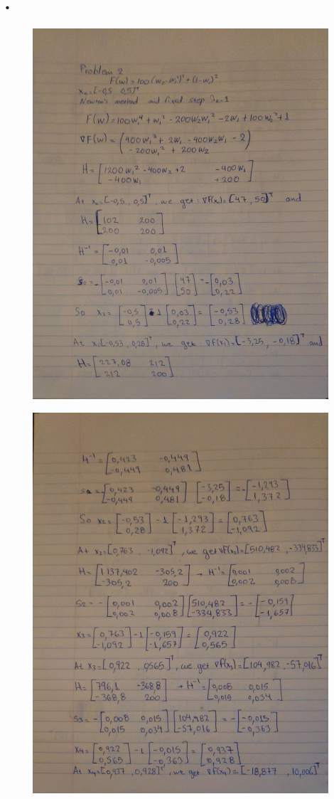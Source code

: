 \documentclass{article}
\begin{document}
\newpage
\section{.}
\begin{figure}[htp]
    \centering
    \includegraphics[width=11cm]{photos/2_1.jpg}
    \caption{}
    \label{}
\end{figure}
\newpage
\begin{figure}[htp]
    \centering
    \includegraphics[width=11cm]{photos/2_2.jpg}
    \caption{}
    \label{}
\end{figure}
\end{document}
